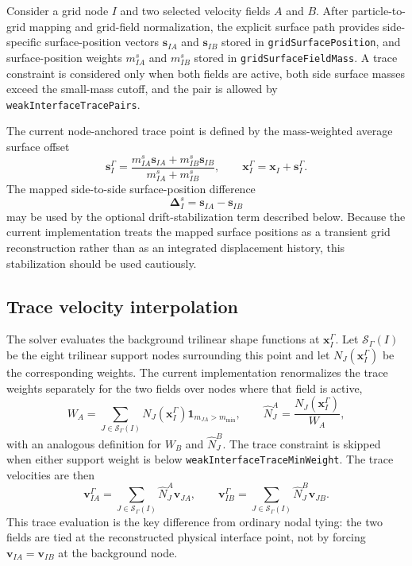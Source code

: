 Consider a grid node $I$ and two selected velocity fields $A$ and $B$.  After particle-to-grid mapping and grid-field normalization, the explicit surface path provides side-specific surface-position vectors $\mathbf{s}_{IA}$ and $\mathbf{s}_{IB}$ stored in \texttt{gridSurfacePosition}, and surface-position weights $m^s_{IA}$ and $m^s_{IB}$ stored in \texttt{gridSurfaceFieldMass}.  A trace constraint is considered only when both fields are active, both side surface masses exceed the small-mass cutoff, and the pair is allowed by \texttt{weakInterfaceTracePairs}.

The current node-anchored trace point is defined by the mass-weighted average surface offset
\begin{equation}
  \mathbf{s}^{\Gamma}_I
  =\frac{m^s_{IA}\mathbf{s}_{IA}+m^s_{IB}\mathbf{s}_{IB}}
         {m^s_{IA}+m^s_{IB}},
  \qquad
  \mathbf{x}^{\Gamma}_I=\mathbf{x}_I+\mathbf{s}^{\Gamma}_I.
  \label{eq:weak-trace-point}
\end{equation}
The mapped side-to-side surface-position difference
\begin{equation}
  \boldsymbol{\Delta}^{s}_I=\mathbf{s}_{IA}-\mathbf{s}_{IB}
  \label{eq:weak-trace-surface-jump}
\end{equation}
may be used by the optional drift-stabilization term described below.  Because the current implementation treats the mapped surface positions as a transient grid reconstruction rather than as an integrated displacement history, this stabilization should be used cautiously.

\subsection{Trace velocity interpolation}

The solver evaluates the background trilinear shape functions at $\mathbf{x}^{\Gamma}_I$.  Let $\mathcal{S}_\Gamma(I)$ be the eight trilinear support nodes surrounding this point and let $N_J(\mathbf{x}^{\Gamma}_I)$ be the corresponding weights.  The current implementation renormalizes the trace weights separately for the two fields over nodes where that field is active,
\begin{equation}
  W_A=\sum_{J\in\mathcal{S}_\Gamma(I)} N_J(\mathbf{x}^{\Gamma}_I)
      \mathbf{1}_{m_{JA}>m_{\min}},
  \qquad
  \widehat N^A_J=\frac{N_J(\mathbf{x}^{\Gamma}_I)}{W_A},
  \label{eq:weak-trace-renormalized-weights-a}
\end{equation}
with an analogous definition for $W_B$ and $\widehat N^B_J$.  The trace constraint is skipped when either support weight is below \texttt{weakInterfaceTraceMinWeight}.  The trace velocities are then
\begin{equation}
  \mathbf{v}^{\Gamma}_{IA}=\sum_{J\in\mathcal{S}_\Gamma(I)}\widehat N^A_J\mathbf{v}_{JA},
  \qquad
  \mathbf{v}^{\Gamma}_{IB}=\sum_{J\in\mathcal{S}_\Gamma(I)}\widehat N^B_J\mathbf{v}_{JB}.
  \label{eq:weak-trace-velocities}
\end{equation}
This trace evaluation is the key difference from ordinary nodal tying: the two fields are tied at the reconstructed physical interface point, not by forcing $\mathbf{v}_{IA}=\mathbf{v}_{IB}$ at the background node.

